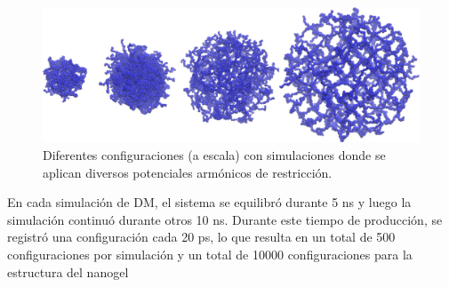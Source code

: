 \begin{figure}[!ht]
	\centering
	\includegraphics[width=0.5\linewidth]{Figures/graph-anexos/geles_radios.png}
	\caption{Diferentes configuraciones (a escala) con simulaciones donde se aplican diversos potenciales arm\'onicos de restricci\'on.}
	\label{fig:anexo:geles}
\end{figure}



En cada simulaci\'on de DM, el sistema se equilibr\'o durante 5 ns y luego la simulaci\'on continu\'o durante otros 10 ns. Durante este tiempo de producci\'on, se registr\'o una configuraci\'on cada 20 ps, lo que resulta en un total de 500 configuraciones por simulaci\'on y un total de 10000 configuraciones para la estructura del nanogel
